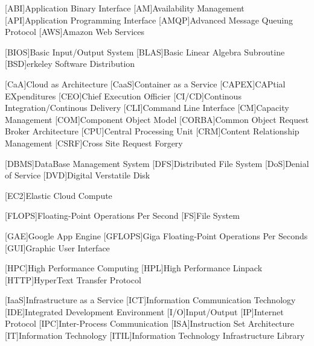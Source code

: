 %
%
[ABI]{Application Binary Interface}
[AM]{Availability Management}
[API]{Application Programming Interface}
[AMQP]{Advanced Message Queuing Protocol}
[AWS]{Amazon Web Services}

[BIOS]{Basic Input/Output System}
[BLAS]{Basic Linear Algebra Subroutine}
[BSD]{erkeley Software Distribution}

[CaA]{Cloud as Architecture}
[CaaS]{Container as a Service}
[CAPEX]{CAPtial EXpenditures}
[CEO]{Chief Execution Officier}
[CI/CD]{Continous Integration/Continous Delivery}
[CLI]{Command Line Interface}
[CM]{Capacity Management}
[COM]{Component Object Model}
[CORBA]{Common Object Request Broker Architecture}
[CPU]{Central Processing Unit}
[CRM]{Content Relationship Management}
[CSRF]{Cross Site Request Forgery}

[DBMS]{DataBase Management System}
[DFS]{Distributed File System}
[DoS]{Denial of Service}
[DVD]{Digital Verstatile Disk}

[EC2]{Elastic Cloud Compute}

[FLOPS]{Floating-Point Operations Per Second}
[FS]{File System}

[GAE]{Google App Engine}
[GFLOPS]{Giga Floating-Point Operations Per Seconds}
[GUI]{Graphic User Interface}

[HPC]{High Performance Computing}
[HPL]{High Performance Linpack}
[HTTP]{HyperText Transfer Protocol}

[IaaS]{Infrastructure as a Service}
[ICT]{Information Communication Technology}
[IDE]{Integrated Development Environment}
[I/O]{Input/Output}
[IP]{Internet Protocol}
[IPC]{Inter-Process Communication}
[ISA]{Instruction Set Architecture}
[IT]{Information Technology}
[ITIL]{Information Technology Infrastructure Library}

